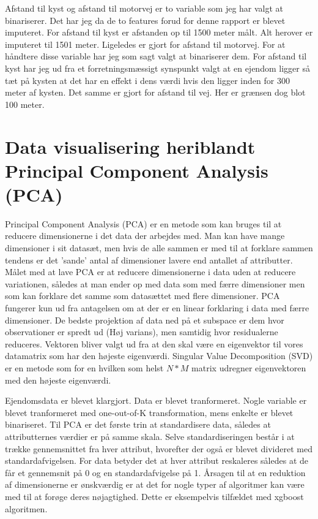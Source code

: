 \documentclass{report}
\begin{document}
Afstand til kyst og afstand til motorvej er to variable som jeg har valgt at binariserer. Det har jeg da de to
features forud for denne rapport er blevet imputeret. For afstand til kyst er afstanden op til 1500 meter målt.
Alt herover er imputeret til 1501 meter. Ligeledes er gjort for afstand til motorvej.
For at håndtere disse variable har jeg som sagt valgt at binariserer dem. For afstand til kyst har jeg ud fra et
forretningsmæssigt synspunkt valgt at en ejendom ligger så tæt på kysten at det har en effekt i dens værdi hvis
den ligger inden for 300 meter af kysten. Det samme er gjort for afstand til vej. Her er grænsen dog blot 100
meter.



\section{Data visualisering heriblandt Principal Component Analysis (PCA)}

Principal Component Analysis (PCA) er en metode som kan bruges til at reducere dimensionerne i det data der arbejdes med. Man kan have mange dimensioner i sit datasæt, men hvis de alle sammen er med til at forklare sammen tendens er det 'sande' antal af dimensioner lavere end antallet af attributter. Målet med at lave PCA er at reducere dimensionerne i data uden at reducere variationen, således at man ender op med data som med færre dimensioner men som kan forklare det samme som datasættet med flere dimensioner. PCA fungerer kun ud fra antagelsen om at der er en linear forklaring i data med færre dimensioner. De bedste projektion af data ned på et subspace er dem hvor observationer er spredt ud (Høj varians), men samtidig hvor residualerne reduceres. 
Vektoren bliver valgt ud fra at den skal være en eigenvektor til vores datamatrix som har den højeste eigenværdi. Singular Value Decomposition (SVD) er en metode som for en hvilken som helst $N*M$ matrix udregner eigenvektoren med den højeste eigenværdi.  

Ejendomsdata er blevet klargjort. Data er blevet tranformeret. Nogle variable er blevet tranformeret med one-out-of-K transformation, mens enkelte er blevet binariseret. 
Til PCA er det første trin at standardisere data, således at attributternes værdier er på samme skala. Selve standardiseringen består i at trække gennemsnittet fra hver attribut, hvorefter der også er blevet divideret med standardafvigelsen. For data betyder det at hver attribut reskaleres således at de får et gennemsnit på 0 og en standardafvigelse på 1. 
Årsagen til at en reduktion af dimensionerne er ønskværdig er at det for nogle typer af algoritmer kan være med til at forøge deres nøjagtighed. Dette er eksempelvis tilfældet med xgboost algoritmen. 
\end{document}
